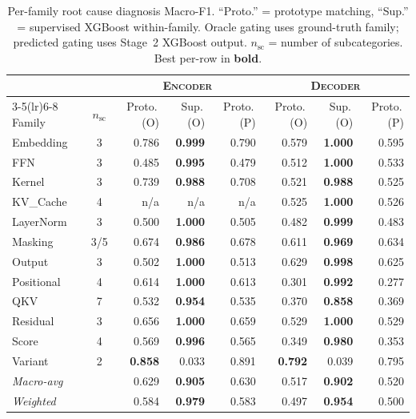 \begin{table}[!ht]
\caption{Per-family root cause diagnosis Macro-F1. ``Proto.'' = prototype matching, ``Sup.'' = supervised XGBoost within-family. Oracle gating uses ground-truth family; predicted gating uses Stage~2 XGBoost output. $n_{\text{sc}}$ = number of subcategories. Best per-row in \textbf{bold}.}
\label{tab:rq5_perfamily}
\centering
\footnotesize
\renewcommand{\arraystretch}{0.95}
\setlength{\tabcolsep}{3pt}
\begin{tabular}{@{} l c rr r rr r @{}}
\toprule
& & \multicolumn{3}{c}{\textsc{Encoder}} & \multicolumn{3}{c}{\textsc{Decoder}} \\
\cmidrule(lr){3-5}\cmidrule(lr){6-8}
Family & $n_{\text{sc}}$ & Proto.\,(O) & Sup.\,(O) & Proto.\,(P) & Proto.\,(O) & Sup.\,(O) & Proto.\,(P) \\
\midrule
Embedding      & 3 & 0.786 & \textbf{0.999} & 0.790 & 0.579 & \textbf{1.000} & 0.595 \\
FFN            & 3 & 0.485 & \textbf{0.995} & 0.479 & 0.512 & \textbf{1.000} & 0.533 \\
Kernel         & 3 & 0.739 & \textbf{0.988} & 0.708 & 0.521 & \textbf{0.988} & 0.525 \\
KV\_Cache      & 4 & n/a   & n/a            & n/a   & 0.525 & \textbf{1.000} & 0.526 \\
LayerNorm      & 3 & 0.500 & \textbf{1.000} & 0.505 & 0.482 & \textbf{0.999} & 0.483 \\
Masking        & 3/5 & 0.674 & \textbf{0.986} & 0.678 & 0.611 & \textbf{0.969} & 0.634 \\
Output         & 3 & 0.502 & \textbf{1.000} & 0.513 & 0.629 & \textbf{0.998} & 0.625 \\
Positional     & 4 & 0.614 & \textbf{1.000} & 0.613 & 0.301 & \textbf{0.992} & 0.277 \\
QKV            & 7 & 0.532 & \textbf{0.954} & 0.535 & 0.370 & \textbf{0.858} & 0.369 \\
Residual       & 3 & 0.656 & \textbf{1.000} & 0.659 & 0.529 & \textbf{1.000} & 0.529 \\
Score          & 4 & 0.569 & \textbf{0.996} & 0.565 & 0.349 & \textbf{0.980} & 0.353 \\
Variant        & 2 & \textbf{0.858} & 0.033 & 0.891 & \textbf{0.792} & 0.039 & 0.795 \\
\midrule
\textit{Macro-avg} & & 0.629 & \textbf{0.905} & 0.630 & 0.517 & \textbf{0.902} & 0.520 \\
\textit{Weighted}  & & 0.584 & \textbf{0.979} & 0.583 & 0.497 & \textbf{0.954} & 0.500 \\
\bottomrule
\end{tabular}
\end{table}

